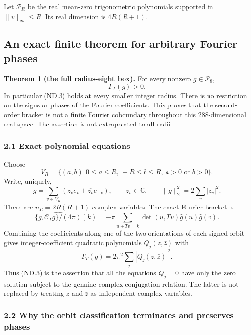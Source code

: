 \] Let \(\mathcal P_R\) be the real mean-zero trigonometric polynomials supported in \(\|v\|_\infty\leq R\). Its real dimension is \(4R(R+1)\).

\subsection{An exact finite theorem for arbitrary Fourier phases}\label{nondegeneracy:an-exact-finite-theorem-for-arbitrary-fourier-phases}

\textbf{Theorem 1 (the full radius-eight box).} For every nonzero \(g\in\mathcal P_8\), \[
                         \boxed{\Gamma_T(g)>0.}             \tag{ND.3}
\] In particular (ND.3) holds at every smaller integer radius. There is no restriction on the signs or phases of the Fourier coefficients. This proves that the second-order bracket is not a finite Fourier coboundary throughout this 288-dimensional real space. The assertion is not extrapolated to all radii.

\subsubsection{2.1 Exact polynomial equations}\label{nondegeneracy:exact-polynomial-equations}

Choose \[
 V_R=\{(a,b):0\leq a\leq R,\ -R\leq b\leq R,
                         \ a>0\text{ or }b>0\}.
\] Write, uniquely, \[
 g=\sum_{v\in V_R}(z_v e_v+\overline{z_v}e_{-v}),\qquad
 z_v\in\mathbb C,\qquad \|g\|_2^2=2\sum_v|z_v|^2.          \tag{ND.4}
\] There are \(n_R=2R(R+1)\) complex variables. The exact Fourier bracket is \[
 \widehat{\{g,\mathcal C_Tg\}/(4\pi)}(k)
       =-\pi\sum_{u+Tv=k}\det(u,Tv)\widehat g(u)\widehat g(v).
 \tag{ND.5}
\] Combining the coefficients along one of the two orientations of each signed orbit gives integer-coefficient quadratic polynomials \(Q_j(z,\bar z)\) with \[
                   \Gamma_T(g)=2\pi^2\sum_j|Q_j(z,\bar z)|^2. \tag{ND.6}
\] Thus (ND.3) is the assertion that all the equations \(Q_j=0\) have only the zero solution subject to the genuine complex-conjugation relation. The latter is not replaced by treating \(z\) and \(\bar z\) as independent complex variables.

\subsubsection{2.2 Why the orbit classification terminates and preserves phases}\label{nondegeneracy:why-the-orbit-classification-terminates-and-preserves-phases}


